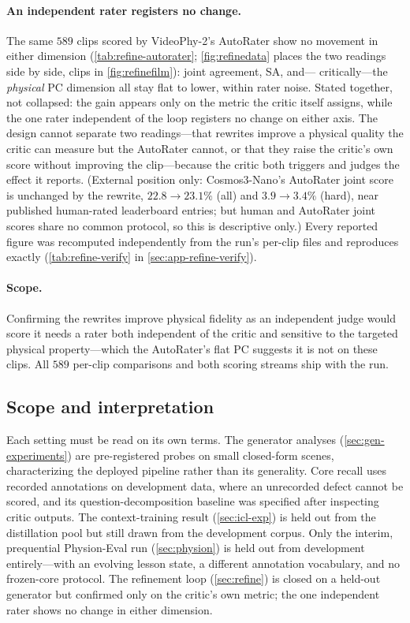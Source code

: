 \paragraph{An independent rater registers no change.} The same $589$ clips scored by VideoPhy-2's
AutoRater show no movement in either dimension (\cref{tab:refine-autorater}; \cref{fig:refinedata}
places the two readings side by side, clips in \cref{fig:refinefilm}): joint agreement, SA, and---%
critically---the \emph{physical} PC dimension all stay flat to lower, within rater noise. Stated
together, not collapsed: the gain appears only on the metric the critic itself assigns, while the
one rater independent of the loop registers no change on either axis. The design cannot separate two
readings---that rewrites improve a physical quality the critic can measure but the AutoRater cannot,
or that they raise the critic's own score without improving the clip---because the critic both
triggers and judges the effect it reports. (External position only: Cosmos3-Nano's AutoRater joint
score is unchanged by the rewrite, $22.8\!\to\!23.1\%$ (all) and $3.9\!\to\!3.4\%$ (hard), near
published human-rated leaderboard entries; but human and AutoRater joint scores share no common
protocol, so this is descriptive only.) Every reported figure was recomputed independently from the
run's per-clip files and reproduces exactly (\cref{tab:refine-verify} in \cref{sec:app-refine-verify}).

\paragraph{Scope.} Confirming the rewrites improve physical fidelity as an independent judge would
score it needs a rater both independent of the critic and sensitive to the targeted physical
property---which the AutoRater's flat PC suggests it is not on these clips. All $589$ per-clip
comparisons and both scoring streams ship with the run.
\subsection{Scope and interpretation}\label{sec:eval-scope}
Each setting must be read on its own terms. The generator analyses (\cref{sec:gen-experiments}) are
pre-registered probes on small closed-form scenes, characterizing the deployed pipeline rather than
its generality. Core recall uses recorded annotations on development data, where an unrecorded defect
cannot be scored, and its question-decomposition baseline was specified after inspecting critic
outputs. The context-training result (\cref{sec:icl-exp}) is held out from the distillation pool but
still drawn from the development corpus. Only the interim, prequential Physion-Eval run
(\cref{sec:physion}) is held out from development entirely---with an evolving lesson state, a
different annotation vocabulary, and no frozen-core protocol. The refinement loop
(\cref{sec:refine}) is closed on a held-out generator but confirmed only on the critic's own metric;
the one independent rater shows no change in either dimension.
